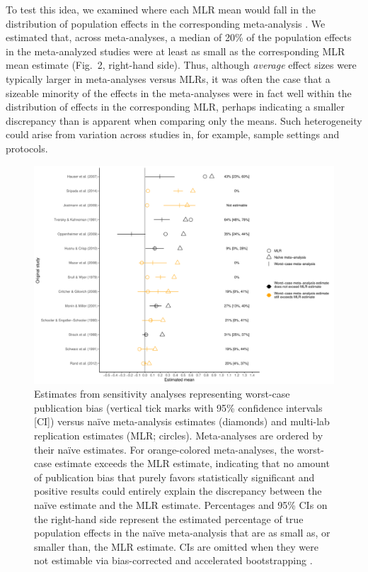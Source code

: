 \documentclass[man]{apa7}
\begin{document}
To test this idea, we examined where each MLR mean would fall in the distribution of population effects in the corresponding meta-analysis \parencite{mathur2020robust}. We estimated that, across meta-analyses, a median  of 20\% of the population effects in the meta-analyzed studies were at least as small as the corresponding MLR mean estimate (Fig.\ 2, right-hand side). Thus, although \emph{average} effect sizes were typically larger in meta-analyses versus MLRs, it was often the case that a sizeable minority of the effects in the meta-analyses were in fact well within the distribution of effects in the corresponding MLR, perhaps indicating a smaller discrepancy than is apparent when comparing only the means. Such heterogeneity could arise from variation across studies in, for example, sample settings and protocols.

\begin{figure}[t]
\centering
     \includegraphics[width=7in]{figs/forest.pdf}
      \caption{Estimates from sensitivity analyses representing worst-case publication bias (vertical tick marks with 95\% confidence intervals [CI]) versus naïve meta-analysis estimates (diamonds) and multi-lab replication estimates (MLR; circles). Meta-analyses are ordered by their naïve estimates. For orange-colored meta-analyses, the worst-case estimate exceeds the MLR estimate, indicating that no amount of publication bias that purely favors statistically significant and positive results could entirely explain the discrepancy between the naïve estimate and the MLR estimate. Percentages and 95\% CIs on the right-hand side represent the estimated percentage of true population effects in the naïve meta-analysis that are as small as, or smaller than, the MLR estimate. CIs are omitted when they were not estimable via bias-corrected and accelerated bootstrapping \parencite{mathur2020robust}.}
\end{figure}
\end{document}
